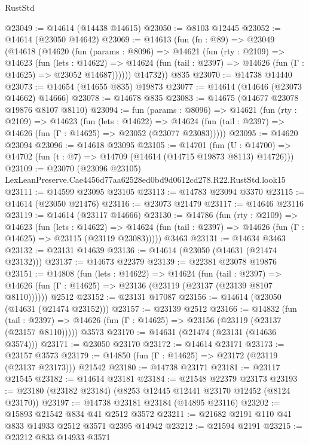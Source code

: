 \begin{lexlean}{RustStd}
\begin{coremodule}
@23049 := @14614 (@14438 @14615)
@23050 := @8103 @12445
@23052 := @14614 (@23050 @14642)
@23069 := @14613
    (fun (fn : @89) =>
    @23049
      (@14618
        (@14620
          (fun (params : @8096) =>
          @14621
            (fun (rty : @2109) =>
            @14623
              (fun (lets : @14622) =>
              @14624 (fun (tail : @2397) => @14626 (fun (Γ : @14625) => @23052 @14687))))))
        @14732))
    @835
@23070 := @14738 @14440
@23073 := @14654 (@14655 @835) @19873
@23077 := @14614 (@14646 (@23073 @14662) @14666)
@23078 := @14678 @835
@23083 := @14675 (@14677 @23078 @19876 @8107 @8110)
@23094 := fun (params : @8096) =>
  @14621
    (fun (rty : @2109) =>
    @14623
      (fun (lets : @14622) =>
      @14624 (fun (tail : @2397) => @14626 (fun (Γ : @14625) => @23052 (@23077 @23083)))))
@23095 := @14620 @23094
@23096 := @14618 @23095
@23105 := @14701
    (fun (U : @14700) => @14702 (fun (t : @7) => @14709 (@14614 (@14715 @19873 @8113) @14726)))
@23109 := @23070
    (@23096 @23105)
    LexLeanPreserve.Cae4456d77aa62528ed0bd9d0612cd278.R22.RustStd.look15
@23111 := @14599 @23095 @23105
@23113 := @14783 @23094 @3370
@23115 := @14614 (@23050 @21476)
@23116 := @23073 @21479
@23117 := @14646 @23116
@23119 := @14614 (@23117 @14666)
@23130 := @14786
    (fun (rty : @2109) =>
    @14623
      (fun (lets : @14622) =>
      @14624 (fun (tail : @2397) => @14626 (fun (Γ : @14625) => @23115 (@23119 @23083)))))
    @3463
@23131 := @14634 @3463
@23132 := @23131 @14639
@23136 := @14614 (@23050 (@14631 (@21474 @23132)))
@23137 := @14673 @22379
@23139 := @22381 @23078 @19876
@23151 := @14808
    (fun (lets : @14622) =>
    @14624
      (fun (tail : @2397) =>
      @14626 (fun (Γ : @14625) => @23136 (@23119 (@23137 (@23139 @8107 @8110))))))
    @2512
@23152 := @23131 @17087
@23156 := @14614 (@23050 (@14631 (@21474 @23152)))
@23157 := @23139 @2512
@23166 := @14832
    (fun (tail : @2397) => @14626 (fun (Γ : @14625) => @23156 (@23119 (@23137 (@23157 @8110)))))
    @3573
@23170 := @14631 (@21474 (@23131 (@14636 @3574)))
@23171 := @23050 @23170
@23172 := @14614 @23171
@23173 := @23157 @3573
@23179 := @14850 (fun (Γ : @14625) => @23172 (@23119 (@23137 @23173))) @21542
@23180 := @14738 @23171
@23181 := @23117 @21545
@23182 := @14614 @23181
@23184 := @21548 @22379 @23173
@23193 := @23180 (@23182 @23184) (@8253 @12445 @12441 @23170 @12452 (@8124 @23170))
@23197 := @14738 @23181 @23184 (@14895 @23116)
@23202 := @15893 @21542 @834 @41 @2512 @3572
@23211 := @21682 @2191 @110 @41 @833 @14933 @2512 @3571 @2395 @14942
@23212 := @21594 @2191
@23215 := @23212 @833 @14933 @3571

\end{coremodule}
\end{lexlean}
